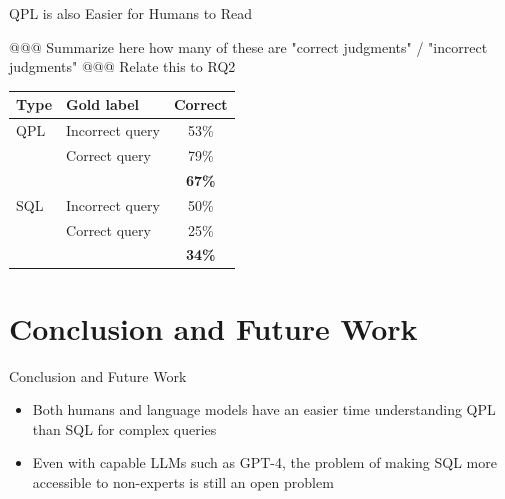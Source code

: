 \documentclass{beamer}
\begin{document}
\begin{frame}{QPL is also Easier for Humans to Read}
    \begin{table}[h]
    @@@ Summarize here how many of these are "correct judgments" / "incorrect judgments"
    @@@ Relate this to RQ2
    \centering
    \begin{tabular}{llc}
        \toprule
        \textbf{Type} & \textbf{Gold label} & \textbf{Correct} \\
        \midrule
        QPL & Incorrect query   & 53\% \\
            & Correct query     & 79\% \\
         &                      & \textbf{67\%} \\
        \midrule
        SQL & Incorrect query  & 50\% \\
            & Correct query    & 25\% \\
         &           & \textbf{34\%} \\
        \bottomrule
    \end{tabular}
\end{table}
\end{frame}

\section{Conclusion and Future Work}

\begin{frame}{Conclusion and Future Work}
    \begin{itemize}
        \item Both humans and language models have an easier time understanding QPL than SQL for complex queries
        \item Even with capable LLMs such as GPT-4, the problem of making SQL more accessible to non-experts is still an open problem
    \end{itemize}
\end{frame}
\end{document}
